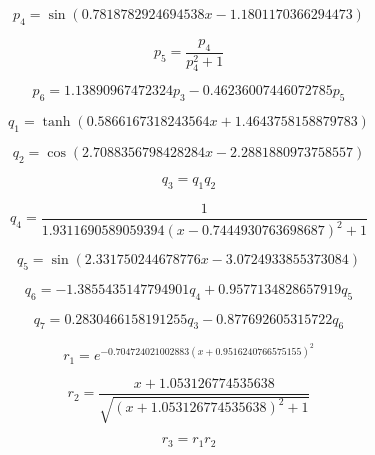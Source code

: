 \begin{equation}
p_{4}=\sin{\left(0.7818782924694538 x - 1.1801170366294473 \right)}
\end{equation}


\begin{equation}
p_{5}=\frac{p_{4}}{p_{4}^{2} + 1}
\end{equation}


\begin{equation}
p_{6}=1.13890967472324 p_{3} - 0.46236007446072785 p_{5}
\end{equation}


\begin{equation}
q_{1}=\tanh{\left(0.5866167318243564 x + 1.4643758158879783 \right)}
\end{equation}


\begin{equation}
q_{2}=\cos{\left(2.7088356798428284 x - 2.2881880973758557 \right)}
\end{equation}


\begin{equation}
q_{3}=q_{1} q_{2}
\end{equation}


\begin{equation}
q_{4}=\frac{1}{1.9311690589059394 \left(x - 0.7444930763698687\right)^{2} + 1}
\end{equation}


\begin{equation}
q_{5}=\sin{\left(2.331750244678776 x - 3.0724933855373084 \right)}
\end{equation}


\begin{equation}
q_{6}=- 1.3855435147794901 q_{4} + 0.9577134828657919 q_{5}
\end{equation}


\begin{equation}
q_{7}=0.2830466158191255 q_{3} - 0.877692605315722 q_{6}
\end{equation}


\begin{equation}
r_{1}=e^{- 0.704724021002883 \left(x + 0.9516240766575155\right)^{2}}
\end{equation}


\begin{equation}
r_{2}=\frac{x + 1.053126774535638}{\sqrt{\left(x + 1.053126774535638\right)^{2} + 1}}
\end{equation}


\begin{equation}
r_{3}=r_{1} r_{2}
\end{equation}


